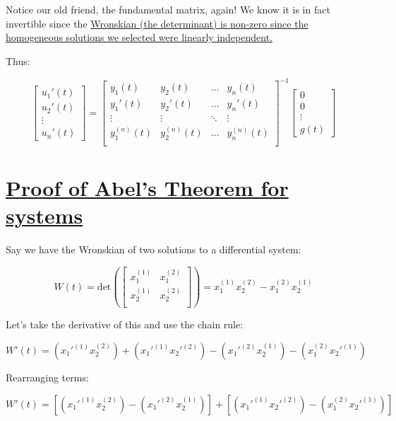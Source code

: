 \documentclass{report}
\begin{document}
{Notice our old friend, the fundamental matrix, again! We know it is in fact invertible since the \hyperref[th:EqLinInd]{Wronskian (the determinant) is non-zero since the homogeneous solutions we selected were linearly independent.}

Thus:

$$
\begin{bmatrix}
    u_1'(t) \\
    u_2'(t) \\
    \vdots \\ 
    u_n'(t)
\end{bmatrix}
=
\begin{bmatrix}
    y_1(t) & y_2(t) & \dots  & y_n(t) \\
    y_1'(t) & y_2'(t) & \dots  & y_n'(t) \\
    \vdots & \vdots & \ddots & \vdots \\
    y_1^{(n)}(t) & y_2^{(n)}(t) & \dots  & y_n^{(n)}(t) \\
\end{bmatrix}^{-1}
\begin{bmatrix}
    0 \\
    0 \\
    \vdots \\ 
    g(t)
\end{bmatrix}
$$

\section{\hyperref[th:wronAbelSys]{Proof of Abel's Theorem for systems}}
\label{sec:wronAbelSys}

Say we have the Wronskian of two solutions to a differential system:

$$
W(t) =
\text{det}\left(
\begin{bmatrix}
    x_1^{(1)} & x_1^{(2)} \\
    x_2^{(1)} & x_2^{(2)} \\
\end{bmatrix}\right)
=x_1^{(1)}x_2^{(2)}-x_1^{(2)}x_2^{(1)}
$$

Let's take the derivative of this and use the chain rule:

$$W'(t) = (x_1'^{(1)}x_2^{(2)}) + (x_1'^{(1)}x_2'^{(2)}) - (x_1'^{(2)}x_2^{(1)}) - (x_1^{(2)}x_2'^{(1)})$$

Rearranging terms:

$$W'(t) = [(x_1'^{(1)}x_2^{(2)}) 
- (x_1'^{(2)}x_2^{(1)})]
+ [(x_1'^{(1)}x_2'^{(2)})  - (x_1^{(2)}x_2'^{(1)})]$$

}
\end{document}
